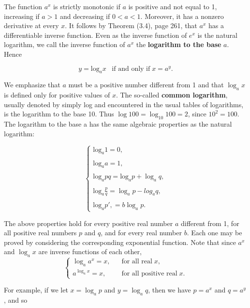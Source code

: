 The function $a^x$ is strictly monotonic if $a$ is positive and not equal to 1, increasing if $a > 1$ and decreasing if $0 < a < 1$. Moreover, it has a nonzero derivative at every $x$. It follows by Theorem (3.4), page 261, that $a^x$ has a differentiable inverse function. Even as the inverse function of $e^x$ is the natural logarithm, we call the inverse function of $a^x$ the \textbf{logarithm to the base} $a$. Hence

$$
  y = \mbox{log}_{a}x \;\;\; \mbox{if and only if}  \;x = a^{y}.
$$

We emphasize that $a$ must be a positive number different from 1 and that $\log_{a}x$ is defined only for positive values of $x$. The so-called \textbf{common logarithm}, usually denoted by simply log and
encountered in the usual tables of logarithms, is the logarithm to the base 10. Thus $\log 100 = \log_{10} 100 = 2$, since $10^2 = 100$. The logarithm to the base a has the same algebraic properties as the natural logarithm:

\begin{theorem} %
$$
\left \{
 \begin{array}{l}
\mbox{log}_{a} 1 = 0, \\
\\
\mbox{log}_{a} a = 1,\\
\\
\mbox{log}_{a} pq = \mbox{log}_{a}p + \log_{a}q,\\
\\
\mbox{log}_{a}\frac{p}{q} = \log_{a}p - log_{a}q,\\
\\
\mbox{log}_{a}p', = b \log_{a}p.
\end{array}
\right.
$$
\end{theorem}

The above properties hold for every positive real number $a$ different from 1, for all positive real numbers $p$ and $q$, and for every real number $b$. Each one may be proved by considering the corresponding exponential function. Note that since $a^x$ and $\log_{a}x$ are inverse functions of each
other,
$$
\left \{
 \begin{array}{ll}
\log_{a}a^x = x,\;\;\;     &\mbox{for all real}\; x, \\
a^{\log_{a} x} = x,\;\;\;  &\mbox{for all positive real}\; x.
\end{array}
\right.
$$

\noindent For example, if we let $x = \log_{a}p$ and $y = \log_{a}q$, then we have $p = a^{x}$ and $q = a^{y}$,  and so


